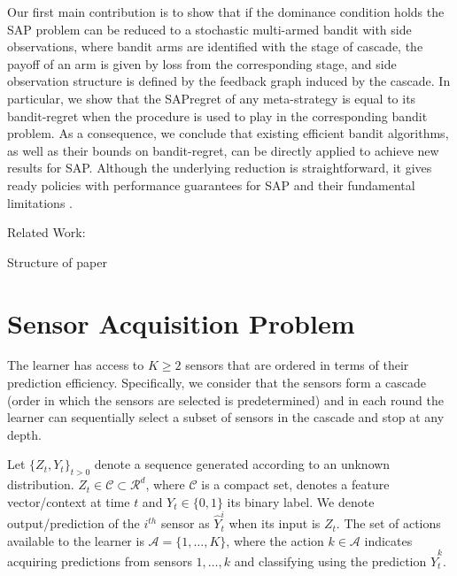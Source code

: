 \documentclass{article}
\begin{document}
Our first main contribution is to show that if the dominance condition holds the SAP problem can be reduced to 
a stochastic multi-armed bandit with side observations,
where bandit arms are identified with the stage of cascade,
the payoff of an arm is given by loss from the corresponding stage, and side observation structure is defined by the feedback graph induced by the cascade. In particular, we show that the SAPregret
of any meta-strategy is equal to its bandit-regret
when the procedure is used to play in the corresponding
bandit problem. As a consequence, we conclude that existing efficient
bandit algorithms, as well as their bounds on bandit-regret,
can be directly applied to achieve new results
for SAP. Although the underlying
reduction is straightforward, it gives ready policies with performance guarantees for SAP and their fundamental limitations .


Related Work: \cite{AISTATS13_SupervisedSequentialLearning_TrapezSaligram}\cite{ICML14_PredictionWithLimitedAdvice_LattimoreCrammerCzepes}

Structure of paper

\section{Sensor Acquisition Problem}
\label{sec:Setup}
The learner has access to $K\geq 2$ sensors that are ordered in terms of their prediction efficiency. Specifically, we consider that the sensors form a cascade (order in which the sensors are selected is predetermined) and in each round the learner can sequentially select a subset of sensors in the cascade and stop at any depth.  

Let $\{Z_t, Y_t\}_{{t>0}}$ denote a sequence generated according to an unknown distribution. $Z_t \in\mathcal{C} \subset  \mathcal{R}^d$, where $\mathcal{C}$ is a compact set, denotes a feature vector/context at time $t$ and $Y_t \in \{0,1\}$ its binary label. We denote output/prediction of the $i^{th}$ sensor as $\hat{Y}^i_t$ when its input is $Z_t$. The set of actions available to the learner is $\mathcal{A}=\{1,\ldots, K\}$, where  the action $k \in \mathcal{A}$ indicates acquiring predictions from sensors $1,\ldots, k$ and classifying using the prediction $\hat{Y}^k_t$. 
\end{document}
